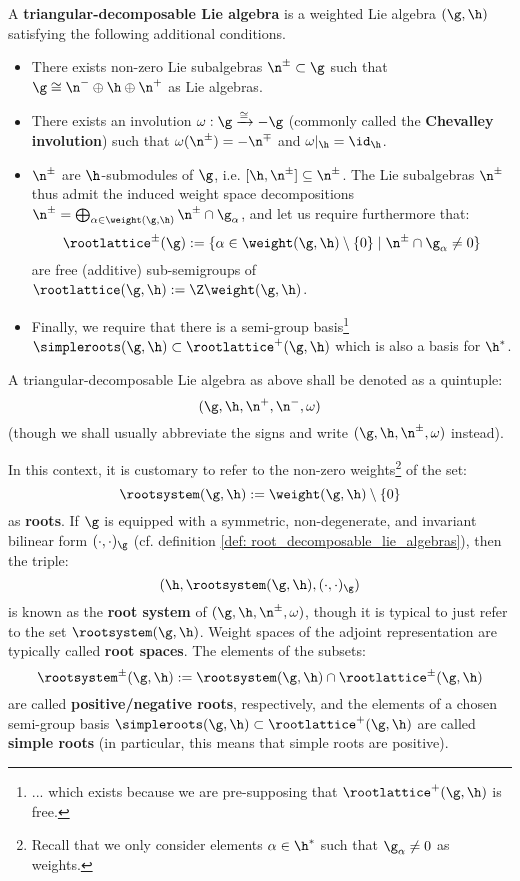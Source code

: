         \begin{definition} \label{def: triangular_decomposable_lie_algebras}
            A \textbf{triangular-decomposable Lie algebra} is a weighted Lie algebra $(\g, \h)$ satisfying the following additional conditions.
            \begin{itemize}
                \item There exists non-zero Lie subalgebras $\n^{\pm} \subset \g$ such that $\g \cong \n^- \oplus \h \oplus \n^+$ as Lie algebras.
                \item There exists an involution $\omega: \g \xrightarrow[]{\cong} -\g$ (commonly called the \textbf{Chevalley involution}) such that $\omega(\n^{\pm}) = -\n^{\mp}$ and $\omega|_{\h} = \id_{\h}$.
                \item $\n^{\pm}$ are $\h$-submodules of $\g$, i.e. $[\h, \n^{\pm}] \subseteq \n^{\pm}$. The Lie subalgebras $\n^{\pm}$ thus admit the induced weight space decompositions $\n^{\pm} = \bigoplus_{\alpha \in \weight(\g, \h)} \n^{\pm} \cap \g_{\alpha}$, and let us require furthermore that:
                    $$\rootlattice^{\pm}(\g) := \{ \alpha \in \weight(\g, \h) \setminus \{0\} \mid \n^{\pm} \cap \g_{\alpha} \not = 0 \}$$
                are free (additive) sub-semigroups of $\rootlattice(\g, \h) := \Z\weight(\g, \h)$.
                \item Finally, we require that there is a semi-group basis\footnote{... which exists because we are pre-supposing that $\rootlattice^+(\g, \h)$ is free.} $\simpleroots(\g, \h) \subset \rootlattice^+(\g, \h)$ which is also a basis for $\h^*$.
            \end{itemize}
            A triangular-decomposable Lie algebra as above shall be denoted as a quintuple:
                $$(\g, \h, \n^+, \n^-, \omega)$$
            (though we shall usually abbreviate the signs and write $(\g, \h, \n^{\pm}, \omega)$ instead).
        \end{definition}
        \begin{convention}
            In this context, it is customary to refer to the non-zero weights\footnote{Recall that we only consider elements $\alpha \in \h^*$ such that $\g_{\alpha} \not = 0$ as weights.} of the set:
                $$\rootsystem(\g, \h) := \weight(\g, \h) \setminus \{0\}$$
            as \textbf{roots}. If $\g$ is equipped with a symmetric, non-degenerate, and invariant bilinear form $(\cdot, \cdot)_{\g}$ (cf. definition \ref{def: root_decomposable_lie_algebras}), then the triple:
                $$( \h, \rootsystem(\g, \h), (\cdot, \cdot)_{\g} )$$
            is known as the \textbf{root system} of $(\g, \h, \n^{\pm}, \omega)$, though it is typical to just refer to the set $\rootsystem(\g, \h)$. Weight spaces of the adjoint representation are typically called \textbf{root spaces}. The elements of the subsets:
                $$\rootsystem^{\pm}(\g, \h) := \rootsystem(\g, \h) \cap \rootlattice^{\pm}(\g, \h)$$
            are called \textbf{positive/negative roots}, respectively, and the elements of a chosen semi-group basis $\simpleroots(\g, \h) \subset \rootlattice^+(\g, \h)$ are called \textbf{simple roots} (in particular, this means that simple roots are positive).
        \end{convention}
